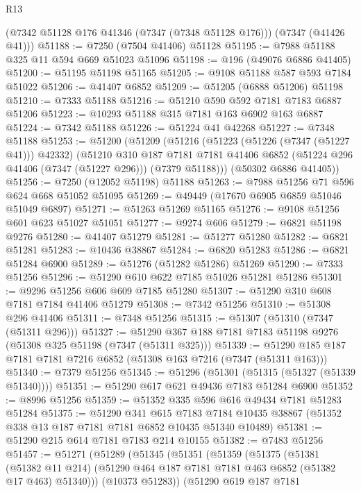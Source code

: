 \begin{lexlean}{R13}
\begin{coremodule}
      (@7342 @51128 @176 @41346 (@7347 (@7348 @51128 @176)))
      (@7347 (@41426 @41)))
@51188 := @7250 (@7504 @41406) @51128
@51195 := @7988 @51188 @325 @11 @594 @669 @51023 @51096
@51198 := @196 (@49076 @6886 @41405)
@51200 := @51195 @51198 @51165
@51205 := @9108 @51188 @587 @593 @7184 @51022
@51206 := @41407 @6852
@51209 := @51205 (@6888 @51206) @51198
@51210 := @7333 @51188
@51216 := @51210 @590 @592 @7181 @7183 @6887 @51206
@51223 := @10293 @51188 @315 @7181 @163 @6902 @163 @6887
@51224 := @7342 @51188
@51226 := @51224 @41 @42268
@51227 := @7348 @51188
@51253 := @51200
    (@51209
      (@51216
        (@51223 (@51226 (@7347 (@51227 @41))) @42332)
        (@51210
          @310
          @187
          @7181
          @7181
          @41406
          @6852
          (@51224 @296 @41406 (@7347 (@51227 @296)))
          (@7379 @51188)))
      (@50302 @6886 @41405))
@51256 := @7250 (@12052 @51198) @51188
@51263 := @7988 @51256 @71 @596 @624 @668 @51052 @51095
@51269 := @49449 (@17670 @6905 @6859 @51046 @51049 @6897)
@51271 := @51263 @51269 @51165
@51276 := @9108 @51256 @601 @623 @51027 @51051
@51277 := @9274 @606
@51279 := @6821 @51198 @9276
@51280 := @41407 @51279
@51281 := @51277 @51280
@51282 := @6821 @51281
@51283 := @10436 @38867
@51284 := @6820 @51283
@51286 := @6821 @51284 @6900
@51289 := @51276 (@51282 @51286) @51269
@51290 := @7333 @51256
@51296 := @51290 @610 @622 @7185 @51026 @51281 @51286
@51301 := @9296 @51256 @606 @609 @7185 @51280
@51307 := @51290 @310 @608 @7181 @7184 @41406 @51279
@51308 := @7342 @51256
@51310 := @51308 @296 @41406
@51311 := @7348 @51256
@51315 := @51307 (@51310 (@7347 (@51311 @296)))
@51327 := @51290 @367 @188 @7181 @7183 @51198 @9276 (@51308 @325 @51198 (@7347 (@51311 @325)))
@51339 := @51290 @185 @187 @7181 @7181 @7216 @6852 (@51308 @163 @7216 (@7347 (@51311 @163)))
@51340 := @7379 @51256
@51345 := @51296 (@51301 (@51315 (@51327 (@51339 @51340))))
@51351 := @51290 @617 @621 @49436 @7183 @51284 @6900
@51352 := @8996 @51256
@51359 := @51352 @335 @596 @616 @49434 @7181 @51283 @51284
@51375 := @51290
    @341
    @615
    @7183
    @7184
    @10435
    @38867
    (@51352 @338 @13 @187 @7181 @7181 @6852 @10435 @51340 @10489)
@51381 := @51290 @215 @614 @7181 @7183 @214 @10155
@51382 := @7483 @51256
@51457 := @51271
    (@51289
      (@51345
        (@51351
          (@51359
            (@51375
              (@51381
                (@51382 @11 @214)
                (@51290 @464 @187 @7181 @7181 @463 @6852 (@51382 @17 @463) @51340)))
            (@10373 @51283))
          (@51290
            @619
            @187
            @7181

\end{coremodule}
\end{lexlean}
